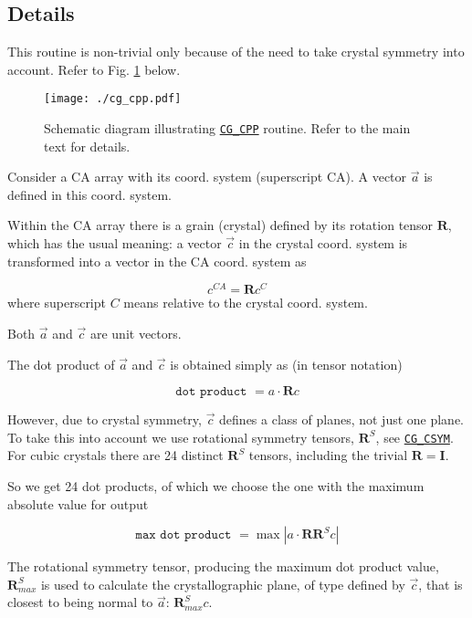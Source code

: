 \subsection{Details}

This routine is non-trivial only because of the
need to take crystal symmetry into account. Refer
to Fig. \ref{fig:cg_cpp} below.

\begin{figure}[htb]
\centering
\texttt{[image: ./cg\_cpp.pdf]}
\caption{Schematic diagram illustrating
\hyperref[sec:cg_cpp]{\texttt{CG\_CPP}}
routine. Refer to the main text for details.}
\label{fig:cg_cpp}
\end{figure}

Consider a CA array with its coord. system (superscript
CA). A vector $\vec{a}$ is defined in this coord. system.

Within the CA array there is a grain (crystal) defined by
its rotation tensor $\mathbf{R}$, which has the usual
meaning: a vector $\vec{c}$ in the crystal coord. system
is transformed into a vector in the CA coord. system as

\begin{equation}
 c^{CA}
  =
   \mathbf{R} c^{C}
 \label{eq:cpp:pub}
\end{equation}
%
where superscript $C$ means relative to the crystal
coord. system.

Both $\vec{a}$ and $\vec{c}$ are unit vectors.

The dot product of $\vec{a}$ and $\vec{c}$ is
obtained simply as (in tensor notation)

\begin{equation}
 \texttt{dot product }
  =
   a\cdot\mathbf{R}c
 \label{eq:cpp:pluck}
\end{equation}

However, due to crystal symmetry, $\vec{c}$ defines
a class of planes, not just one plane. To take this into
account we use rotational symmetry tensors, $\mathbf{R}^S$,
see \hyperref[sec:cg_csym]{\texttt{CG\_CSYM}}.
For cubic crystals there are 24 distinct $\mathbf{R}^S$
tensors, including the trivial $\mathbf{R=I}$.

So we get 24 dot products, of which we choose
the one with the maximum absolute value
for output

\begin{equation}
 \texttt{max dot product }
  =
   \max
    |
     a \cdot \mathbf{R} \mathbf{R}^S c
    |
 \label{eq:cpp:mumps}
\end{equation}

The rotational symmetry
tensor, producing the maximum dot product value,
$\mathbf{R}^S_{max}$ is used to calculate the
crystallographic plane, of type defined by $\vec{c}$,
that is closest to being normal to $\vec{a}$:
$\mathbf{R}^S_{max}c$.


